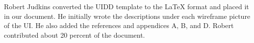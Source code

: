 \documentclass{article}
\begin{document}
Robert Judkins converted the UIDD template to the LaTeX format and placed it in our document. He initially wrote the descriptions under each wireframe picture of the UI. He also added the references and appendices A, B, and D. Robert contributed about 20 percent of the document.

\newpage




\newpage



\end{document}
